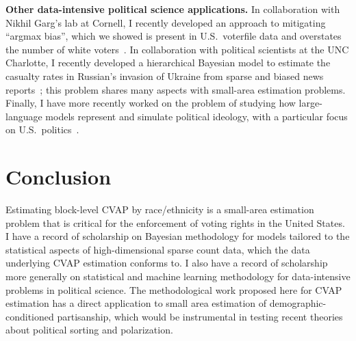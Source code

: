 \documentclass[11pt]{article}
\begin{document}
\textbf{Other data-intensive political science applications.} In collaboration with Nikhil Garg's lab at Cornell, I recently developed an approach to mitigating ``argmax bias'', which we showed is present in U.S.~voterfile data and overstates the number of white voters~\citep{dong2024addressing}. In collaboration with political scientists at the UNC Charlotte, I recently developed a hierarchical Bayesian model to estimate the casualty rates in Russian's invasion of Ukraine from sparse and biased news reports~\citep{radford2023estimating}; this problem shares many aspects with small-area estimation problems. Finally, I have more recently worked on the problem of studying how large-language models represent and simulate political ideology, with a particular focus on U.S.~politics~\citep{o2023measurement}.

\section*{Conclusion} Estimating block-level CVAP by race/ethnicity is a small-area estimation problem that is critical for the enforcement of voting rights in the United States. I have a record of scholarship on Bayesian methodology for models tailored to the statistical aspects of high-dimensional sparse count data, which the data underlying CVAP estimation conforms to. I also have a record of scholarship more generally on statistical and machine learning methodology for data-intensive problems in political science. The methodological work proposed here for CVAP estimation has a direct application to small area estimation of demographic-conditioned partisanship, which would be instrumental in testing recent theories about political sorting and polarization.



\end{document}
